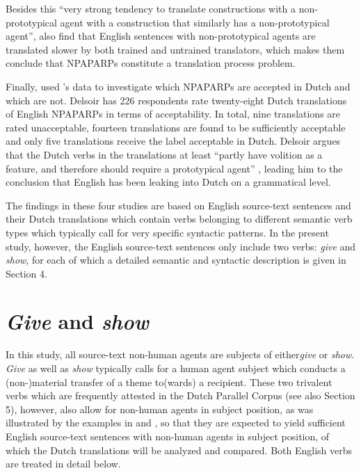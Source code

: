\documentclass[output=paper]{LSP/langsci}
\begin{document}
Besides this “very strong tendency to translate constructions with a non-prototypical agent with a construction that similarly has a non-prototypical agent”, \citet[11]{Vandepitte2011} also find that English sentences with non-prototypical agents are translated slower by both trained and untrained translators, which makes them conclude that NPAPARPs constitute a translation process problem. 

Finally, \citet{Delsoir2011} used \citeauthor{Vandepitte2011}'s \citeyear{Vandepitte2011} data to investigate which NPAPARPs are accepted in Dutch and which are not. Delsoir has 226 respondents rate twenty-eight Dutch translations of English NPAPARPs in terms of acceptability. In total, nine translations are rated unacceptable, fourteen translations are found to be sufficiently acceptable and only five translations receive the label acceptable in Dutch. Delsoir argues that the Dutch verbs in the translations at least “partly have volition as a feature, and therefore should require a prototypical agent” \citet[34]{Vandepitte2011}, leading him to the conclusion that English has been leaking into Dutch on a grammatical level. 

The findings in these four studies are based on English source-text sentences and their Dutch translations which contain verbs belonging to different semantic verb types which typically call for very specific syntactic patterns. In the present study, however, the English source-text sentences only include two verbs: \textit{give} and \textit{show}, for each of which a detailed semantic and syntactic description is given in Section 4.  

\section{\textit{Give} and \textit{show}}

In this study, all source-text non-human agents are subjects of either\textit{give} or \textit{show}. \textit{Give} as well as \textit{show} typically calls for a human agent subject which conducts a (non-)material transfer of a theme to(wards) a recipient. These two trivalent verbs which are frequently attested in the Dutch Parallel Corpus (see also Section 5), however, also allow for non-human agents in subject position, as was illustrated by the examples in  and , so that they are expected to yield sufficient English source-text sentences with non-human agents in subject position, of which the Dutch translations will be analyzed and compared. Both English verbs are treated in detail below.  
  
\end{document}
